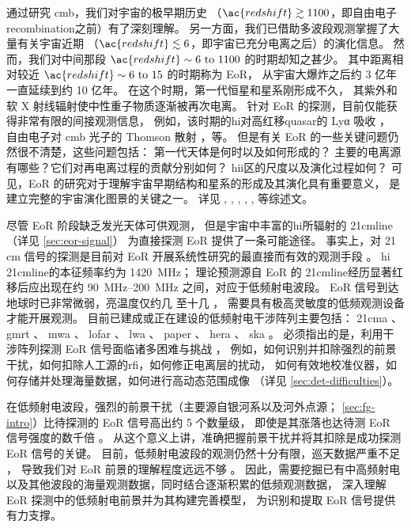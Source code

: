 通过研究 \ac{cmb}，我们对宇宙的极早期历史
（$\ac{redshift} \gtrsim 1100$，即自由电子\ac{recombination}之前）有了深刻理解。
另一方面，我们已借助多波段观测掌握了大量有关宇宙近期
（$\ac{redshift} \lesssim 6$，即宇宙已充分电离之后）的演化信息。
然而，我们对中间那段 $\ac{redshift} \sim \numrange{6}{1100}$ 的时期却知之甚少。
其中距离相对较近 $\ac{redshift} \sim \numrange{6}{15}$ 的时期称为 EoR，
从宇宙大爆炸之后约 3 亿年一直延续到约 10 亿年。
在这个时期，第一代恒星和星系刚形成不久，
其紫外和软 X 射线辐射使中性重子物质逐渐被再次电离。
针对 EoR 的探测，目前仅能获得非常有限的间接观测信息，
例如，该时期的\ac{hi}对高红移\ac{quasar}的 Lyα 吸收 \cite{becker2001}，
自由电子对 \ac{cmb} 光子的 Thomson 散射 \cite{kaplinghat2003}，等。
但是有关 EoR 的一些关键问题仍然很不清楚，这些问题包括：
第一代天体是何时以及如何形成的？
主要的电离源有哪些？它们对再电离过程的贡献分别如何？
\ac{hii}区的尺度以及演化过程如何？
可见，EoR 的研究对于理解宇宙早期结构和星系的形成及其演化具有重要意义，
是建立完整的宇宙演化图景的关键之一。
详见 , ,
, ,
,  等综述文。

尽管 EoR 阶段缺乏发光天体可供观测，
但是宇宙中丰富的\ac{hi}所辐射的 \ac{21cmline}（详见 \autoref{sec:eor-signal}）
为直接探测 EoR 提供了一条可能途径。
事实上，对 21\,cm 信号的探测是目前对 EoR 开展系统性研究的最直接而有效的观测手段
\cite{madau1997,tozzi2000,furlanetto2006,koopmans2015,furlanetto2016}。
\ac{hi} \ac{21cmline}的本征频率约为 \SI{1420}{\MHz}；
理论预测源自 EoR 的 \ac{21cmline}经历显著红移后应出现在约
\SIrange{90}{200}{\MHz} 之间，对应于低频射电波段。
EoR 信号到达地球时已非常微弱，亮温度仅约几 \si{\mK} 至十几 \si{\mK}，
需要具有极高灵敏度的低频观测设备才能开展观测。
目前已建成或正在建设的低频射电干涉阵列主要包括：
\ac{21cma} \cite{zheng2016}、
\ac{gmrt} \cite{paciga2011}、
\ac{mwa} \cite{bowman2013,tingay2013}、
\ac{lofar} \cite{vanHaarlem2013}、
\ac{lwa} \cite{ellingson2009}、
\ac{paper} \cite{parsons2010}、
\ac{hera} \cite{deBoer2017}、
\ac{ska} \cite{mellema2013,koopmans2015}。
必须指出的是，利用干涉阵列探测 EoR 信号面临诸多困难与挑战
\cite{morales2010,wijnholds2010}，
例如，如何识别并扣除强烈的前景干扰，如何扣除人工源的\ac{rfi}，如何修正电离层的扰动，
如何有效地校准仪器，如何存储并处理海量数据，如何进行高动态范围成像
（详见 \autoref{sec:det-difficulties}）。

在低频射电波段，强烈的前景干扰（主要源自银河系以及河外点源；
\autoref{sec:fg-intro}）比待探测的 EoR 信号高出约 5 个数量级，
即使是其涨落也达待测 EoR 信号强度的数千倍 \cite{zaroubi2013}。
从这个意义上讲，准确把握前景干扰并将其扣除是成功探测 EoR 信号的关键。
目前，低频射电波段的观测仍然十分有限，巡天数据严重不足
\cite{deOliveiraCosta2008,zheng2017gal}，
导致我们对 EoR 前景的理解程度远远不够
\cite{liu2012,harker2015,offringa2016,murray2017,procopio2017}。
因此，需要挖掘已有中高频射电以及其他波段的海量观测数据，同时结合逐渐积累的低频观测数据，
深入理解 EoR 探测中的低频射电前景并为其构建完善模型，
为识别和提取 EoR 信号提供有力支撑。



